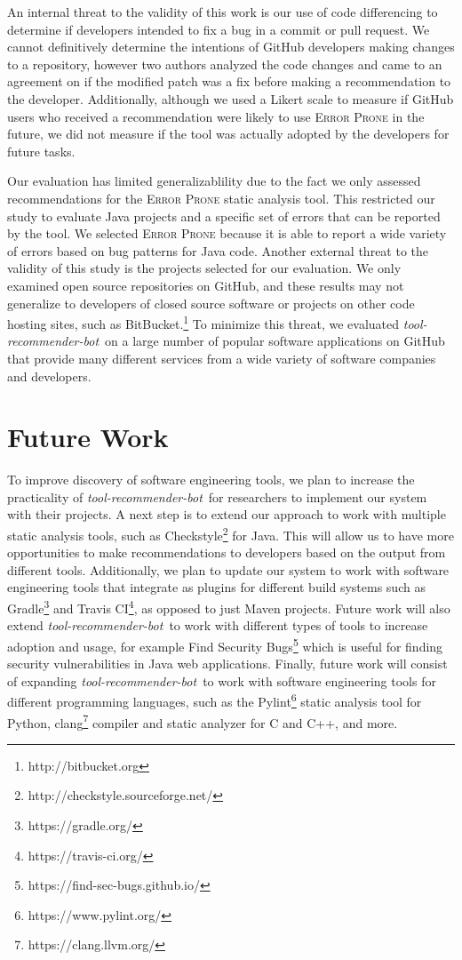 \documentclass[sigconf,review,anonymous]{acmart}
\newcommand{\tool}{\textsl{tool-recommender-bot}}
\begin{document}
An internal threat to the validity of this work is our use of code differencing to determine if developers intended to fix a bug in a commit or pull request. We cannot definitively determine the intentions of GitHub developers making changes to a repository, however two authors analyzed the code changes and came to an agreement on if the modified patch was a fix before making a recommendation to the developer. Additionally, although we used a Likert scale to measure if GitHub users who received a recommendation were likely to use \textsc{Error Prone} in the future, we did not measure if the tool was actually adopted by the developers for future tasks.

Our evaluation has limited generalizablility due to the fact we only assessed recommendations for the \textsc{Error Prone} static analysis tool. This restricted our study to evaluate Java projects and a specific set of errors that can be reported by the tool. We selected \textsc{Error Prone} because it is able to report a wide variety of errors based on bug patterns for Java code. Another external threat to the validity of this study is the projects selected for our evaluation. We only examined open source repositories on GitHub, and these results may not generalize to developers of closed source software or projects on other code hosting sites, such as BitBucket.\footnote{http://bitbucket.org} To minimize this threat, we evaluated \tool~on a large number of popular software applications on GitHub that provide many different services from a wide variety of software companies and developers. 

\section{Future Work}

To improve discovery of software engineering tools, we plan to increase the practicality of \tool~for researchers to implement our system with their projects. A next step is to extend our approach to work with multiple static analysis tools, such as Checkstyle\footnote{http://checkstyle.sourceforge.net/} for Java. This will allow us to have more opportunities to make recommendations to developers based on the output from different tools. Additionally, we plan to update our system to work with software engineering tools that integrate as plugins for different build systems such as Gradle\footnote{https://gradle.org/} and Travis CI\footnote{https://travis-ci.org/}, as opposed to just Maven projects. Future work will also extend \tool~to work with different types of tools to increase adoption and usage, for example Find Security Bugs\footnote{https://find-sec-bugs.github.io/} which is useful for finding security vulnerabilities in Java web applications. Finally, future work will consist of expanding \tool~to work with software engineering tools for different programming languages, such as the Pylint\footnote{https://www.pylint.org/} static analysis tool for Python, clang\footnote{https://clang.llvm.org/} compiler and static analyzer for C and C++, and more.
\end{document}
